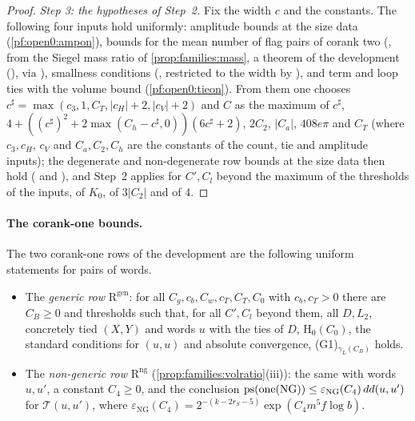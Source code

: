 \begin{proof}
\emph{Step 3: the hypotheses of Step~2.} Fix the width $c$ and the constants. The following four inputs hold uniformly: amplitude
bounds at the size data (\cref{pf:open0:ampon}),
bounds for the mean number of flag pairs of corank two (,
from the Siegel mass ratio of \cref{prop:families:mass}, a theorem of the development
(), via ),
smallness conditions (, restricted to the width by
), and term and loop ties with the volume bound
(\cref{pf:open0:tieon}). From them one chooses $c^\sharp=\max(c_3,1,C_T,|c_H|+2,|c_V|+2)$ and $C$ as
the maximum of $c^\sharp$, $4+((c^\sharp)^2+2\max(C_h-c^\sharp,0))(6c^\sharp+2)$, $2C_2$, $|C_a|$, $408e\pi$ and $C_T$ (where $c_3,c_H$, $c_V$
and $C_a,C_2,C_h$ are the constants of the count, tie and amplitude inputs); the degenerate and non-degenerate row bounds at the
size data then hold ( and ),
and Step~2 applies for $C',C_l$ beyond the maximum of the thresholds of the inputs, of $K_0$, of $3|C_2|$ and of $4$.
\end{proof}

\paragraph{The corank-one bounds.}
The two corank-one rows of the development are the following uniform statements for pairs of words.
\begin{itemize}
\item The \emph{generic row} $\mathrm{R}^{\mathrm{gen}}$: for all $C_g,c_b,C_w,c_T,C_T,C_0$ with $c_b,c_T>0$ there are $C_B\ge0$ and
thresholds such that, for all $C',C_l$ beyond them, all $D,L_2$, concretely tied $(X,Y)$ and words $u$ with the ties of $D$,
$\mathrm{H}_0(C_0)$, the standard conditions for $(u,u)$ and absolute convergence, (G1)$_{\gamma_L(C_B)}$ holds.
\item The \emph{non-generic row} $\mathrm{R}^{\mathrm{ng}}$ (\cref{prop:families:volratio}(iii)): the same with words $u,u'$,
a constant $C_4\ge0$, and the conclusion $\operatorname{ps}(\operatorname{one}(\mathrm{NG}))\le\varepsilon_{\mathrm{NG}}(C_4)\,dd(u,u')$ for
$\mathcal T(u,u')$, where $\varepsilon_{\mathrm{NG}}(C_4)=2^{-(k-2r_S-5)}\exp(C_4m^5f\log b)$.
\end{itemize}

